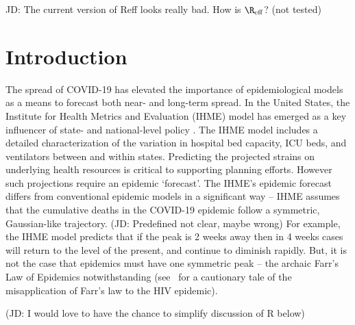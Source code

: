 \newcommand{\Reff}{\ensuremath{\R_{\mathrm{eff}}}}

JD: The current version of Reff looks really bad. How is \Reff? (not tested)

\section{Introduction}
The spread of COVID-19 has elevated the importance of epidemiological
models as a means to forecast both near- and long-term spread. 
In the United States, the Institute for Health Metrics and Evaluation (IHME)
model has emerged as a key influencer of state- and national-level
policy \citep{covid2020forecasting}.  
The IHME model includes a detailed characterization
of the variation in
hospital bed capacity, ICU beds, and ventilators between and within
states. Predicting the projected strains on underlying
health resources is critical to supporting planning efforts.
However such projections require
an epidemic `forecast'.  The IHME's epidemic forecast
differs from conventional
epidemic models in a significant way -- IHME assumes
that the cumulative deaths in the COVID-19 epidemic
follow a symmetric, Gaussian-like trajectory. (JD: Predefined not clear, maybe wrong)
For example, the 
IHME model predicts that if the peak is 2 weeks away then in 4 weeks
cases will return to the level of the present, and continue
to diminish rapidly.  But, it is not the case
that epidemics must have one symmetric peak -- 
the archaic Farr's Law of Epidemics notwithstanding
(see~\citep{bregman1990farr} for a cautionary tale of the 
misapplication of Farr's law to the HIV epidemic). 

(JD: I would love to have the chance to simplify discussion of R below)

